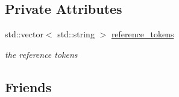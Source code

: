 \subsection*{Private Attributes}
\begin{DoxyCompactItemize}
\item 
std\+::vector$<$ std\+::string $>$ \mbox{\hyperlink{classnlohmann_1_1json__pointer_a07a990a6838de4f38ee9d881e7b9fd61}{reference\+\_\+tokens}}
\begin{DoxyCompactList}\small\item\em the reference tokens \end{DoxyCompactList}\end{DoxyCompactItemize}
\subsection*{Friends}
